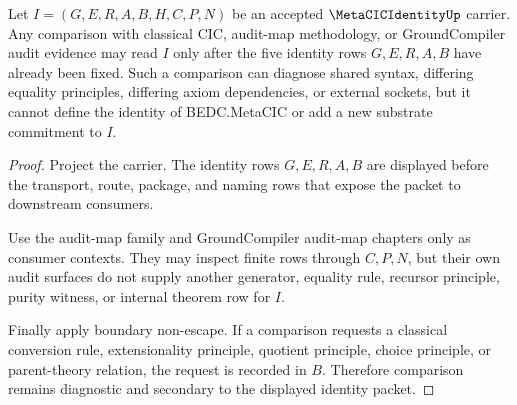 \begin{theorem}
\label{thm:metacic-identity-comparison-secondary}
Let $I=(G,E,R,A,B,H,C,P,N)$ be an accepted $\MetaCICIdentityUp$ carrier. Any comparison with classical CIC, audit-map methodology, or GroundCompiler audit evidence may read $I$ only after the five identity rows $G,E,R,A,B$ have already been fixed. Such a comparison can diagnose shared syntax, differing equality principles, differing axiom dependencies, or external sockets, but it cannot define the identity of BEDC.MetaCIC or add a new substrate commitment to $I$.
\end{theorem}
\begin{proof}
Project the carrier. The identity rows $G,E,R,A,B$ are displayed before the transport, route, package, and naming rows that expose the packet to downstream consumers.

Use the audit-map family and GroundCompiler audit-map chapters only as consumer contexts. They may inspect finite rows through $C,P,N$, but their own audit surfaces do not supply another generator, equality rule, recursor principle, purity witness, or internal theorem row for $I$.

Finally apply boundary non-escape. If a comparison requests a classical conversion rule, extensionality principle, quotient principle, choice principle, or parent-theory relation, the request is recorded in $B$. Therefore comparison remains diagnostic and secondary to the displayed identity packet.
\end{proof}

